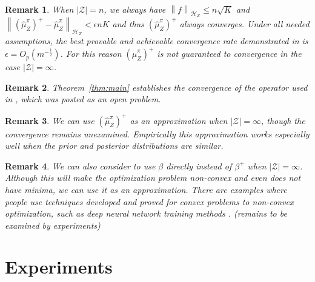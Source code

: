 \documentclass[a4paper]{article}
\renewcommand{\cal}{\mathcal}
\newcommand{\norm}[1]{\left\lVert#1\right\rVert}
\newtheorem{remark}{Remark}
\newcommand{\thmref}[1]{Theorem~\ref{#1}}
\begin{document}
\begin{remark}
When $|\cal{Z}| = n$, we always have $\norm{f}_{\cal{H}_Z} \leq n\sqrt{K}$ and $\norm{(\widehat{\mu}_Z^\pi)^+ - \widehat{\mu}_Z^\pi}_{\cal{H}_Z} < \epsilon n K$ and thus $(\widehat{\mu}_Z^\pi)^+$ always converges. Under all needed assumptions, the best provable and achievable convergence rate demonstrated in \cite{fukumizu2011kernel} is $\epsilon = O_p(m^{-\frac{1}{2}})$. For this reason $(\widehat{\mu}_Z^\pi)^+$ is not guaranteed to convergence in the case $|\cal{Z}| = \infty$.
\end{remark}
\begin{remark}
\thmref{thm:main} establishes the convergence of the operator used in \cite{nishiyama2012hilbert}, which was posted as an open problem.
\end{remark}
\begin{remark}
We can use $(\widehat{\mu}_Z^\pi)^+$ as an approximation when $|\cal{Z}| = \infty$, though the convergence remains unexamined. Empirically this approximation works especially well when the prior and posterior distributions are similar.
\end{remark}
\begin{remark}
We can also consider to use $\beta$ directly instead of $\beta^+$ when $|\cal{Z}| = \infty$. Although this will make the optimization problem non-convex and even does not have minima, we can use it as an approximation. There are examples where people use techniques developed and proved for convex problems to non-convex optimization, such as deep neural network training methods \cite{nesterov1983method}\cite{duchi2011adaptive}. ({\color{red}remains to be examined by experiments})
\end{remark}
\section{Experiments}


\end{document}
